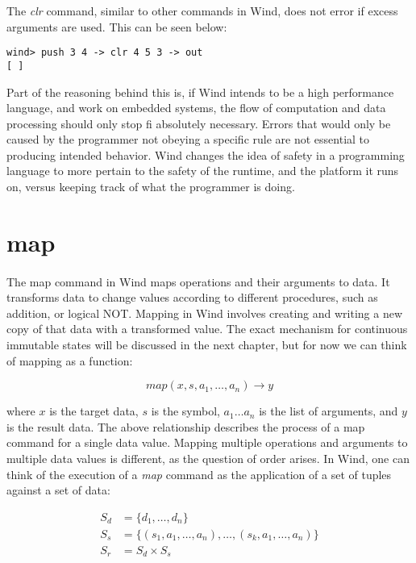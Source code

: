 \par The \emph{clr} command, similar to other commands in Wind, does not error if excess arguments are used. This can be seen below:

\begin{verbatim}
wind> push 3 4 -> clr 4 5 3 -> out
[ ]
\end{verbatim}

\par Part of the reasoning behind this is, if Wind intends to be a high performance language, and work on embedded systems, the flow of computation and data processing should only stop fi absolutely necessary. Errors that would only be caused by the programmer not obeying a specific rule  are not essential to producing intended behavior. Wind changes the idea of safety in a programming language to more pertain to the safety of the runtime, and the platform it runs on, versus keeping track of what the programmer is doing.

\section{map}

\paragraph{  } The map command in Wind maps operations and their arguments to data. It transforms data to change values according to different procedures, such as addition, or logical NOT. Mapping in Wind involves creating and writing a new copy of that data with a transformed value. The exact mechanism for continuous immutable states will be discussed in the next chapter, but for now we can think of mapping as a function:

$$
map(x, s, a_1, \dots, a_n) \longrightarrow y
$$

where $x$ is the target data, $s$ is the symbol, $a_1 \dots a_n$ is the list of arguments, and $y$ is the result data. The above relationship describes the process of a map command for a single data value. Mapping multiple operations and arguments to multiple data values is different, as the question of order arises. In Wind, one can think of the execution of a \emph{map} command as the application of a set of tuples against a set of data:

\begin{align*}
 S_d &= \{d_1,\dots,d_n\} \\
 S_s &= \{ (s_1, a_1,\dots,a_n), \dots,  (s_k, a_1,\dots,a_n)\} \\
 S_r &= S_d \times S_s
\end{align*}

